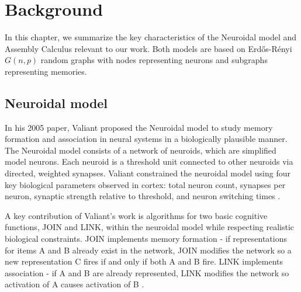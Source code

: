 \chapter{Background}

In this chapter, we summarize the key characteristics of the Neuroidal model and Assembly Calculus relevant to our work. Both models are based on Erdős-R{\'e}nyi $G(n,p)$ random graphs with nodes representing neurons and subgraphs representing memories. 

\section{Neuroidal model}

In his 2005 paper, Valiant proposed the Neuroidal model to study memory formation and association in neural systems in a biologically plausible manner. The Neuroidal model consists of a network of neuroids, which are simplified model neurons. Each neuroid is a threshold unit connected to other neuroids via directed, weighted synapses. Valiant constrained the neuroidal model using four key biological parameters observed in cortex: total neuron count, synapses per neuron, synaptic strength relative to threshold, and neuron switching times \cite{valiant2005memorization}.

A key contribution of Valiant's work is algorithms for two basic cognitive functions, JOIN and LINK, within the neuroidal model while respecting realistic biological constraints. JOIN implements memory formation - if representations for items A and B already exist in the network, JOIN modifies the network so a new representation C fires if and only if both A and B fire. LINK implements association - if A and B are already represented, LINK modifies the network so activation of A causes activation of B \cite{valiant2005memorization}.

